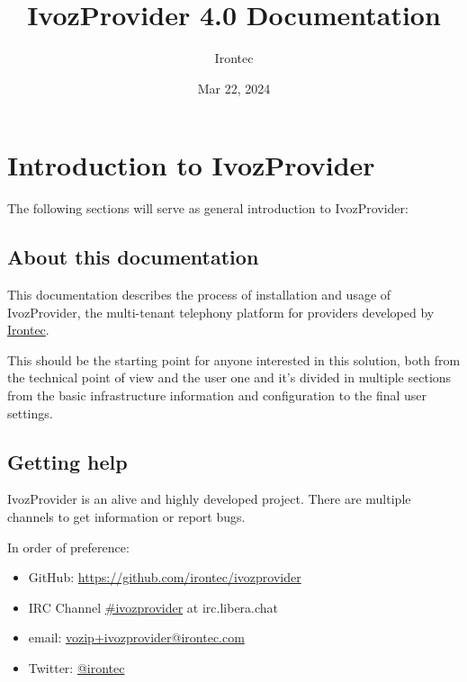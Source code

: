 \documentclass[letterpaper,10pt,english]{sphinxmanual}
\title{IvozProvider 4.0 Documentation}
\date{Mar 22, 2024}
\author{Irontec}
\begin{document}
\maketitle
\tableofcontents
{}\label{index::doc}



\chapter{Introduction to IvozProvider}
\label{basic_concepts/intro/index::doc}\label{basic_concepts/intro/index:introduction-to-ivozprovider}\label{basic_concepts/intro/index:ivozprovider-official-documentation}
The following sections will serve as general introduction to IvozProvider:


\section{About this documentation}
\label{basic_concepts/intro/about::doc}\label{basic_concepts/intro/about:about-this-documentation}
This documentation describes the process of installation and usage of
IvozProvider, the multi-tenant telephony platform for providers developed
by \href{http://irontec.com}{Irontec}.

This should be the starting point for anyone interested in this solution,
both from the technical point of view and the user one and it's divided
in multiple sections from the basic infrastructure information and configuration
to the final user settings.


\section{Getting help}
\label{basic_concepts/intro/getting_help:getting-help}\label{basic_concepts/intro/getting_help::doc}\label{basic_concepts/intro/getting_help:id1}
IvozProvider is an alive and highly developed project. There are
multiple channels to get information or report bugs.

In order of preference:
\begin{itemize}
\item {} 
GitHub: \url{https://github.com/irontec/ivozprovider}

\item {} 
IRC Channel \href{https://kiwiirc.com/nextclient/irc.libera.chat/\#ivozprovider}{\#ivozprovider} at irc.libera.chat

\item {} 
email: \href{mailto:vozip+ivozprovider@irontec.com}{vozip+ivozprovider@irontec.com}

\item {} 
Twitter: \href{https://twitter.com/irontec}{@irontec}

\end{itemize}
\end{document}

